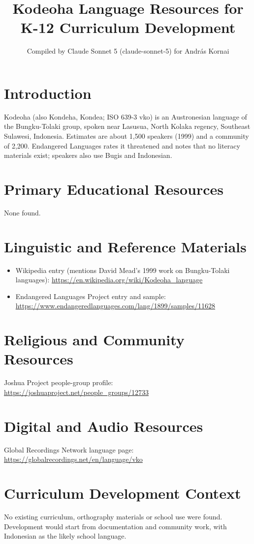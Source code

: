 \documentclass[12pt]{article}
\title{Kodeoha Language Resources for K-12 Curriculum Development}
\author{Compiled by Claude Sonnet 5 (claude-sonnet-5) for Andr\'as Kornai}
\date{}
\begin{document}
\maketitle
\section{Introduction}
Kodeoha (also Kondeha, Kondea; ISO 639-3 vko) is an Austronesian language of the Bungku-Tolaki group, spoken near Lasusua, North Kolaka regency, Southeast Sulawesi, Indonesia. Estimates are about 1,500 speakers (1999) and a community of 2,200. Endangered Languages rates it threatened and notes that no literacy materials exist; speakers also use Bugis and Indonesian.
\section{Primary Educational Resources}
None found.
\section{Linguistic and Reference Materials}
\begin{itemize}
\item Wikipedia entry (mentions David Mead's 1999 work on Bungku-Tolaki languages): \url{https://en.wikipedia.org/wiki/Kodeoha_language}
\item Endangered Languages Project entry and sample: \url{https://www.endangeredlanguages.com/lang/1899/samples/11628}
\end{itemize}
\section{Religious and Community Resources}
Joshua Project people-group profile: \url{https://joshuaproject.net/people_groups/12733}
\section{Digital and Audio Resources}
Global Recordings Network language page: \url{https://globalrecordings.net/en/language/vko}
\section{Curriculum Development Context}
No existing curriculum, orthography materials or school use were found. Development would start from documentation and community work, with Indonesian as the likely school language.
\end{document}
